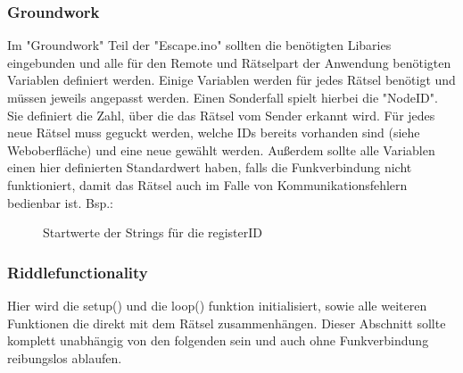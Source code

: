 \documentclass[12pt]{article} %
\begin{document}
\subsubsection{Groundwork}

Im "Groundwork" Teil der "Escape.ino" sollten die benötigten Libaries eingebunden und alle für den Remote und Rätselpart der Anwendung benötigten Variablen definiert werden. 
Einige Variablen werden für jedes Rätsel benötigt und müssen jeweils angepasst werden. Einen Sonderfall spielt hierbei die "NodeID".
Sie definiert die Zahl, über die das Rätsel vom Sender erkannt wird. Für jedes neue Rätsel muss geguckt werden, welche IDs bereits vorhanden sind (siehe Weboberfläche) und eine neue gewählt werden. 
Außerdem sollte alle Variablen einen hier definierten Standardwert haben, falls die Funkverbindung nicht funktioniert, damit das Rätsel auch im Falle von Kommunikationsfehlern bedienbar ist. Bsp.:

\begin{figure}[H] %
	\caption{Startwerte der Strings für die registerID}
	\label{fig:def}
\end{figure}

\subsubsection{Riddlefunctionality}
Hier wird die setup() und die loop() funktion initialisiert, sowie alle weiteren Funktionen die direkt mit dem Rätsel zusammenhängen. 
Dieser Abschnitt sollte komplett unabhängig von den folgenden sein und auch ohne Funkverbindung reibungslos ablaufen.
\end{document}
